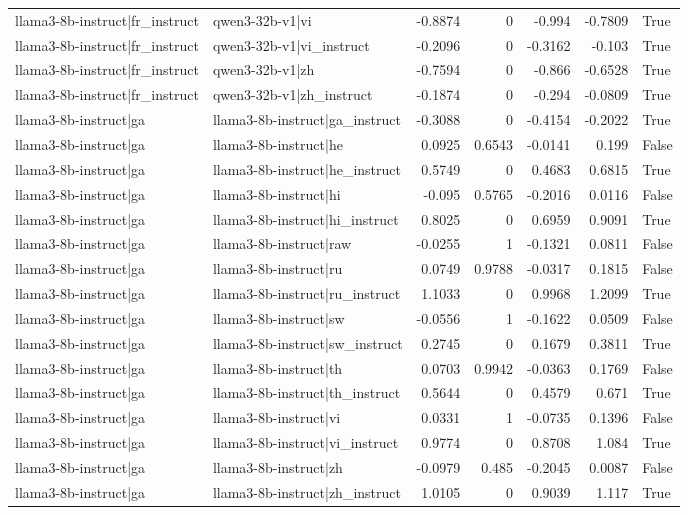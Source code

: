 \begin{table}
\begin{tabular}{l l r r r r l}
llama3-8b-instruct|fr_instruct & qwen3-32b-v1|vi & -0.8874 & 0 & -0.994 & -0.7809 & True \\
llama3-8b-instruct|fr_instruct & qwen3-32b-v1|vi_instruct & -0.2096 & 0 & -0.3162 & -0.103 & True \\
llama3-8b-instruct|fr_instruct & qwen3-32b-v1|zh & -0.7594 & 0 & -0.866 & -0.6528 & True \\
llama3-8b-instruct|fr_instruct & qwen3-32b-v1|zh_instruct & -0.1874 & 0 & -0.294 & -0.0809 & True \\
llama3-8b-instruct|ga & llama3-8b-instruct|ga_instruct & -0.3088 & 0 & -0.4154 & -0.2022 & True \\
llama3-8b-instruct|ga & llama3-8b-instruct|he & 0.0925 & 0.6543 & -0.0141 & 0.199 & False \\
llama3-8b-instruct|ga & llama3-8b-instruct|he_instruct & 0.5749 & 0 & 0.4683 & 0.6815 & True \\
llama3-8b-instruct|ga & llama3-8b-instruct|hi & -0.095 & 0.5765 & -0.2016 & 0.0116 & False \\
llama3-8b-instruct|ga & llama3-8b-instruct|hi_instruct & 0.8025 & 0 & 0.6959 & 0.9091 & True \\
llama3-8b-instruct|ga & llama3-8b-instruct|raw & -0.0255 & 1 & -0.1321 & 0.0811 & False \\
llama3-8b-instruct|ga & llama3-8b-instruct|ru & 0.0749 & 0.9788 & -0.0317 & 0.1815 & False \\
llama3-8b-instruct|ga & llama3-8b-instruct|ru_instruct & 1.1033 & 0 & 0.9968 & 1.2099 & True \\
llama3-8b-instruct|ga & llama3-8b-instruct|sw & -0.0556 & 1 & -0.1622 & 0.0509 & False \\
llama3-8b-instruct|ga & llama3-8b-instruct|sw_instruct & 0.2745 & 0 & 0.1679 & 0.3811 & True \\
llama3-8b-instruct|ga & llama3-8b-instruct|th & 0.0703 & 0.9942 & -0.0363 & 0.1769 & False \\
llama3-8b-instruct|ga & llama3-8b-instruct|th_instruct & 0.5644 & 0 & 0.4579 & 0.671 & True \\
llama3-8b-instruct|ga & llama3-8b-instruct|vi & 0.0331 & 1 & -0.0735 & 0.1396 & False \\
llama3-8b-instruct|ga & llama3-8b-instruct|vi_instruct & 0.9774 & 0 & 0.8708 & 1.084 & True \\
llama3-8b-instruct|ga & llama3-8b-instruct|zh & -0.0979 & 0.485 & -0.2045 & 0.0087 & False \\
llama3-8b-instruct|ga & llama3-8b-instruct|zh_instruct & 1.0105 & 0 & 0.9039 & 1.117 & True \\

\end{tabular}
\end{table}
